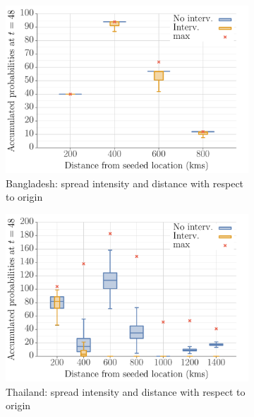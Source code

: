 \documentclass[10pt]{article}
\theoremstyle{definition}
\begin{document}
\begin{figure}[!ht]
\begin{subfigure}[b]{.32\textwidth}
\includegraphics[width=\textwidth]{../cellular_automata/results/dist_inf_plots/BD_dist_prob_B_box.pdf}
\caption{Bangladesh: spread intensity and distance with respect to origin\label{fig:bgdBContourBox}}
\end{subfigure}
\begin{subfigure}[b]{.32\textwidth}
\includegraphics[width=\textwidth]{../cellular_automata/results/dist_inf_plots/TH_dist_prob_B_box.pdf}
\caption{Thailand: spread intensity and distance with respect to origin\label{fig:thaBContourBox}}
\end{subfigure}
\begin{subfigure}[b]{.32\textwidth}

\end{subfigure}
\end{figure}
\end{document}
